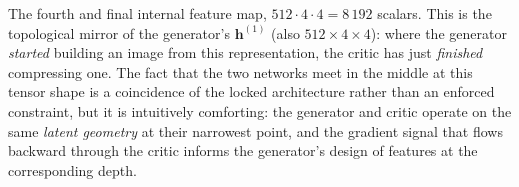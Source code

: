 
The fourth and final internal feature map, $512 \cdot 4 \cdot 4 =
8\,192$ scalars. This is the topological mirror of the generator's
$\mathbf{h}^{(1)}$ (also $512 \times 4 \times 4$): where the generator
\emph{started} building an image from this representation, the critic
has just \emph{finished} compressing one. The fact that the two
networks meet in the middle at this tensor shape is a coincidence of
the locked architecture rather than an enforced constraint, but it is
intuitively comforting: the generator and critic operate on the same
\emph{latent geometry} at their narrowest point, and the gradient signal
that flows backward through the critic informs the generator's design
of features at the corresponding depth.

